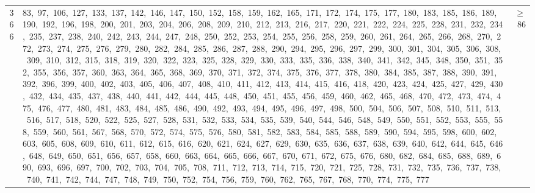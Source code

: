 \begin{longtable}{c|p{}|r}
366 & 83,\ 97,\ 106,\ 127,\ 133,\ 137,\ 142,\ 146,\ 147,\ 150,\ 152,\ 158,\ 159,\ 162,\ 165,\ 171,\ 172,\ 174,\ 175,\ 177,\ 180,\ 183,\ 185,\ 186,\ 189,\ 190,\ 192,\ 196,\ 198,\ 200,\ 201,\ 203,\ 204,\ 206,\ 208,\ 209,\ 210,\ 212,\ 213,\ 216,\ 217,\ 220,\ 221,\ 222,\ 224,\ 225,\ 228,\ 231,\ 232,\ 234,\ 235,\ 237,\ 238,\ 240,\ 242,\ 243,\ 244,\ 247,\ 248,\ 250,\ 252,\ 253,\ 254,\ 255,\ 256,\ 258,\ 259,\ 260,\ 261,\ 264,\ 265,\ 266,\ 268,\ 270,\ 272,\ 273,\ 274,\ 275,\ 276,\ 279,\ 280,\ 282,\ 284,\ 285,\ 286,\ 287,\ 288,\ 290,\ 294,\ 295,\ 296,\ 297,\ 299,\ 300,\ 301,\ 304,\ 305,\ 306,\ 308,\ 309,\ 310,\ 312,\ 315,\ 318,\ 319,\ 320,\ 322,\ 323,\ 325,\ 328,\ 329,\ 330,\ 333,\ 335,\ 336,\ 338,\ 340,\ 341,\ 342,\ 345,\ 348,\ 350,\ 351,\ 352,\ 355,\ 356,\ 357,\ 360,\ 363,\ 364,\ 365,\ 368,\ 369,\ 370,\ 371,\ 372,\ 374,\ 375,\ 376,\ 377,\ 378,\ 380,\ 384,\ 385,\ 387,\ 388,\ 390,\ 391,\ 392,\ 396,\ 399,\ 400,\ 402,\ 403,\ 405,\ 406,\ 407,\ 408,\ 410,\ 411,\ 412,\ 413,\ 414,\ 415,\ 416,\ 418,\ 420,\ 423,\ 424,\ 425,\ 427,\ 429,\ 430,\ 432,\ 434,\ 435,\ 437,\ 438,\ 440,\ 441,\ 442,\ 444,\ 445,\ 448,\ 450,\ 451,\ 455,\ 456,\ 459,\ 460,\ 462,\ 465,\ 468,\ 470,\ 472,\ 473,\ 474,\ 475,\ 476,\ 477,\ 480,\ 481,\ 483,\ 484,\ 485,\ 486,\ 490,\ 492,\ 493,\ 494,\ 495,\ 496,\ 497,\ 498,\ 500,\ 504,\ 506,\ 507,\ 508,\ 510,\ 511,\ 513,\ 516,\ 517,\ 518,\ 520,\ 522,\ 525,\ 527,\ 528,\ 531,\ 532,\ 533,\ 534,\ 535,\ 539,\ 540,\ 544,\ 546,\ 548,\ 549,\ 550,\ 551,\ 552,\ 553,\ 555,\ 558,\ 559,\ 560,\ 561,\ 567,\ 568,\ 570,\ 572,\ 574,\ 575,\ 576,\ 580,\ 581,\ 582,\ 583,\ 584,\ 585,\ 588,\ 589,\ 590,\ 594,\ 595,\ 598,\ 600,\ 602,\ 603,\ 605,\ 608,\ 609,\ 610,\ 611,\ 612,\ 615,\ 616,\ 620,\ 621,\ 624,\ 627,\ 629,\ 630,\ 635,\ 636,\ 637,\ 638,\ 639,\ 640,\ 642,\ 644,\ 645,\ 646,\ 648,\ 649,\ 650,\ 651,\ 656,\ 657,\ 658,\ 660,\ 663,\ 664,\ 665,\ 666,\ 667,\ 670,\ 671,\ 672,\ 675,\ 676,\ 680,\ 682,\ 684,\ 685,\ 688,\ 689,\ 690,\ 693,\ 696,\ 697,\ 700,\ 702,\ 703,\ 704,\ 705,\ 708,\ 711,\ 712,\ 713,\ 714,\ 715,\ 720,\ 721,\ 725,\ 728,\ 731,\ 732,\ 735,\ 736,\ 737,\ 738,\ 740,\ 741,\ 742,\ 744,\ 747,\ 748,\ 749,\ 750,\ 752,\ 754,\ 756,\ 759,\ 760,\ 762,\ 765,\ 767,\ 768,\ 770,\ 774,\ 775,\ 777 & $\ge$ 86 \\

\end{longtable}
